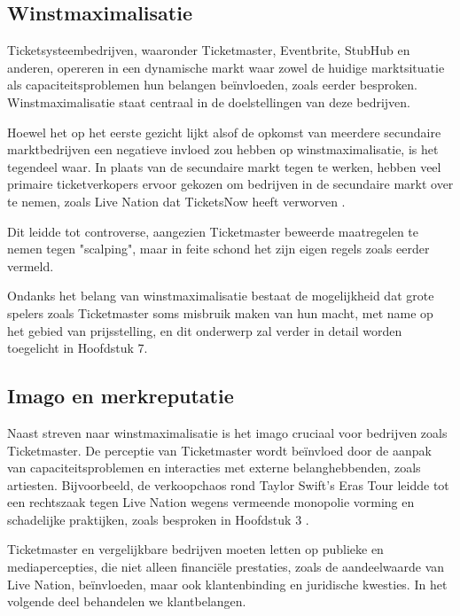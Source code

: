 \subsection{Winstmaximalisatie}
Ticketsysteembedrijven, waaronder Ticketmaster, Eventbrite, StubHub en anderen, opereren in een dynamische markt waar zowel de huidige 
marktsituatie als capaciteitsproblemen hun belangen beïnvloeden, zoals eerder besproken. Winstmaximalisatie staat centraal in de doelstellingen 
van deze bedrijven.

\vspace{5mm}
Hoewel het op het eerste gezicht lijkt alsof de opkomst van meerdere secundaire marktbedrijven een negatieve invloed zou hebben op 
winstmaximalisatie, is het tegendeel waar. In plaats van de secundaire markt tegen te werken, hebben veel primaire ticketverkopers ervoor gekozen 
om bedrijven in de secundaire markt over te nemen, zoals Live Nation dat TicketsNow heeft verworven \cite{Holmstrom2019}.

\vspace{5mm}
Dit leidde tot controverse, aangezien Ticketmaster beweerde maatregelen te nemen tegen "scalping", maar in feite schond het zijn eigen regels zoals 
eerder vermeld. \cite{CBC:online}

\vspace{5mm}
Ondanks het belang van winstmaximalisatie bestaat de mogelijkheid dat grote spelers zoals Ticketmaster soms misbruik maken van hun macht, met name 
op het gebied van prijsstelling, en dit onderwerp zal verder in detail worden toegelicht in Hoofdstuk 7.


\subsection{Imago en merkreputatie}

Naast streven naar winstmaximalisatie is het imago cruciaal voor bedrijven zoals Ticketmaster. De perceptie van Ticketmaster wordt beïnvloed door 
de aanpak van capaciteitsproblemen en interacties met externe belanghebbenden, zoals artiesten. Bijvoorbeeld, de verkoopchaos rond Taylor Swift's 
Eras Tour leidde tot een rechtszaak tegen Live Nation wegens vermeende monopolie vorming en schadelijke praktijken, zoals besproken in Hoofdstuk 3 
\cite{Knack:online}.

\vspace{5mm}

Ticketmaster en vergelijkbare bedrijven moeten letten op publieke en mediapercepties, die niet alleen financiële prestaties, zoals de aandeelwaarde 
van Live Nation, beïnvloeden, maar ook klantenbinding en juridische kwesties. In het volgende deel behandelen we klantbelangen.

